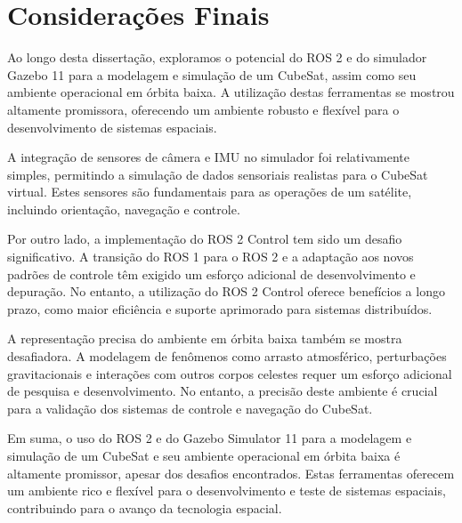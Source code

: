 \section{Considerações Finais}

Ao longo desta dissertação, exploramos o potencial do ROS 2 e do simulador Gazebo 11 para a modelagem e simulação de um CubeSat, assim como seu ambiente operacional em órbita baixa. A utilização destas ferramentas se mostrou altamente promissora, oferecendo um ambiente robusto e flexível para o desenvolvimento de sistemas espaciais.

A integração de sensores de câmera e IMU no simulador foi relativamente simples, permitindo a simulação de dados sensoriais realistas para o CubeSat virtual. Estes sensores são fundamentais para as operações de um satélite, incluindo orientação, navegação e controle.

Por outro lado, a implementação do ROS 2 Control tem sido um desafio significativo. A transição do ROS 1 para o ROS 2 e a adaptação aos novos padrões de controle têm exigido um esforço adicional de desenvolvimento e depuração. No entanto, a utilização do ROS 2 Control oferece benefícios a longo prazo, como maior eficiência e suporte aprimorado para sistemas distribuídos.

A representação precisa do ambiente em órbita baixa também se mostra desafiadora. A modelagem de fenômenos como arrasto atmosférico, perturbações gravitacionais e interações com outros corpos celestes requer um esforço adicional de pesquisa e desenvolvimento. No entanto, a precisão deste ambiente é crucial para a validação dos sistemas de controle e navegação do CubeSat.

Em suma, o uso do ROS 2 e do Gazebo Simulator 11 para a modelagem e simulação de um CubeSat e seu ambiente operacional em órbita baixa é altamente promissor, apesar dos desafios encontrados. Estas ferramentas oferecem um ambiente rico e flexível para o desenvolvimento e teste de sistemas espaciais, contribuindo para o avanço da tecnologia espacial.
